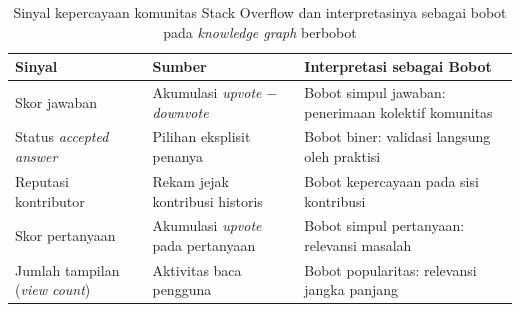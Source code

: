 

\begin{table}[!htbp]
\centering
\caption{Sinyal kepercayaan komunitas Stack Overflow dan interpretasinya sebagai
bobot pada \emph{knowledge graph} berbobot}
\label{tab:so_signals}
\small
\begin{tabular}{|p{3.5cm}|p{4.5cm}|p{6.0cm}|}
\hline
\textbf{Sinyal} & \textbf{Sumber} & \textbf{Interpretasi sebagai Bobot} \\
\hline
Skor jawaban &
Akumulasi \emph{upvote} $-$ \emph{downvote} &
Bobot simpul jawaban: penerimaan kolektif komunitas \\
\hline
Status \emph{accepted answer} &
Pilihan eksplisit penanya &
Bobot biner: validasi langsung oleh praktisi \\
\hline
Reputasi kontributor &
Rekam jejak kontribusi historis &
Bobot kepercayaan pada sisi kontribusi \\
\hline
Skor pertanyaan &
Akumulasi \emph{upvote} pada pertanyaan &
Bobot simpul pertanyaan: relevansi masalah \\
\hline
Jumlah tampilan (\emph{view count}) &
Aktivitas baca pengguna &
Bobot popularitas: relevansi jangka panjang \\
\hline
\end{tabular}
\end{table}